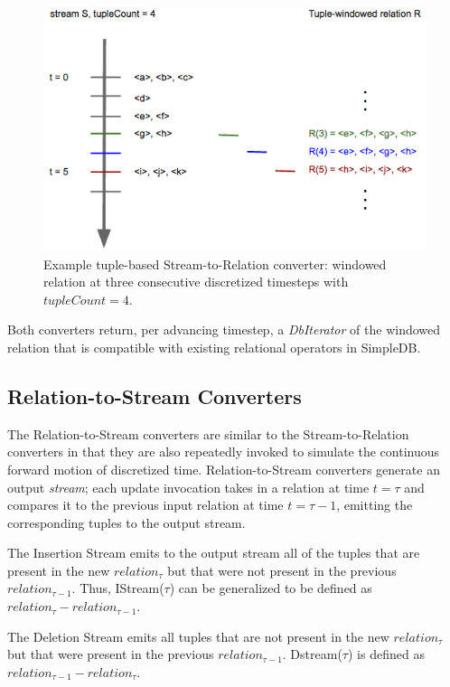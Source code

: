 \documentclass[a4paper, 10pt, conference]{IEEEconf}
\begin{document}
\begin{figure}[tpH]
    \centering
    \centerline{\includegraphics[totalheight=4cm]{tuple_window.png}}
    \caption{Example tuple-based Stream-to-Relation converter: windowed relation at three consecutive discretized timesteps with $tupleCount = 4$.}
    \label{fig:tuple_window}
\end{figure}

Both converters return, per advancing timestep, a \textit{DbIterator} of the windowed relation that is compatible with existing relational operators in SimpleDB.

\subsection{Relation-to-Stream Converters}
The Relation-to-Stream converters are similar to the Stream-to-Relation converters in that they are also repeatedly invoked to simulate the continuous forward motion of discretized time. Relation-to-Stream converters generate an output \textit{stream}; each update invocation takes in a relation at time $t = \tau$ and compares it to the previous input relation at time $t = \tau - 1$, emitting the corresponding tuples to the output stream. 

The Insertion Stream emits to the output stream all of the tuples that are present in the new $relation_{\tau}$ but that were not present in the previous $relation_{\tau - 1}$. Thus, IStream($\tau$) can be generalized to be defined as $relation_{\tau} -relation_{\tau - 1}$.

The Deletion Stream emits all tuples that are not present in the new $relation_{\tau}$ but that were present in the previous $relation_{\tau - 1}$. Dstream($\tau$) is defined as $relation_{\tau - 1} - relation_{\tau}$.
\end{document}
